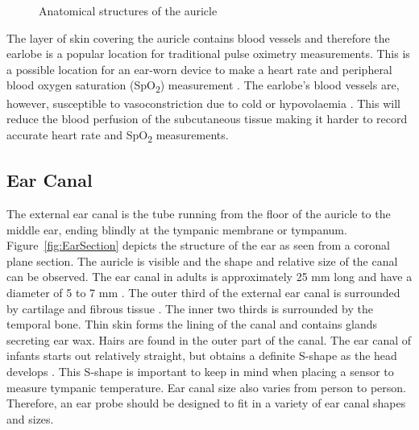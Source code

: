 \medskip

\begin{figure}[H]
\centering
\graphicspath{{figs/}}
\def\svgwidth{200pt}

\caption{Anatomical structures of the auricle}
\label{fig:Auricle}
\end{figure}

The layer of skin covering the auricle contains blood vessels and therefore the earlobe is a popular location for traditional pulse oximetry measurements. This is a possible location for an ear-worn device to make a heart rate and peripheral blood oxygen saturation (SpO\textsubscript{2}) measurement \citep{poh2010motion}. The earlobe's blood vessels are, however, susceptible to vasoconstriction due to cold or hypovolaemia \citep{WHO2011UsingPulseOxi}. This will reduce the blood perfusion of the subcutaneous tissue making it harder to record accurate heart rate and SpO\textsubscript{2} measurements.

\subsection{Ear Canal}
The external ear canal is the tube running from the floor of the auricle to the middle ear, ending blindly at the tympanic membrane or tympanum. Figure~\ref{fig:EarSection} depicts the structure of the ear as seen from a coronal plane section. The auricle is visible and the shape and relative size of the canal can be observed.
The ear canal in adults is approximately 25 mm long and have a diameter of 5 to 7 mm \citep{alvord1997anatomy}. The outer third of the external ear canal is surrounded by cartilage and fibrous tissue \citep{ExternalAuditoryCanal}. The inner two thirds is surrounded by the temporal bone. Thin skin forms the lining of the canal and contains glands secreting ear wax. Hairs are found in the outer part of the canal. The ear canal of infants starts out relatively straight, but obtains a definite S-shape as the head develops \citep{alvord1997anatomy}. This S-shape is important to keep in mind when placing a sensor to measure tympanic temperature. Ear canal size also varies from person to person. Therefore, an ear probe should be designed to fit in a variety of ear canal shapes and sizes.

